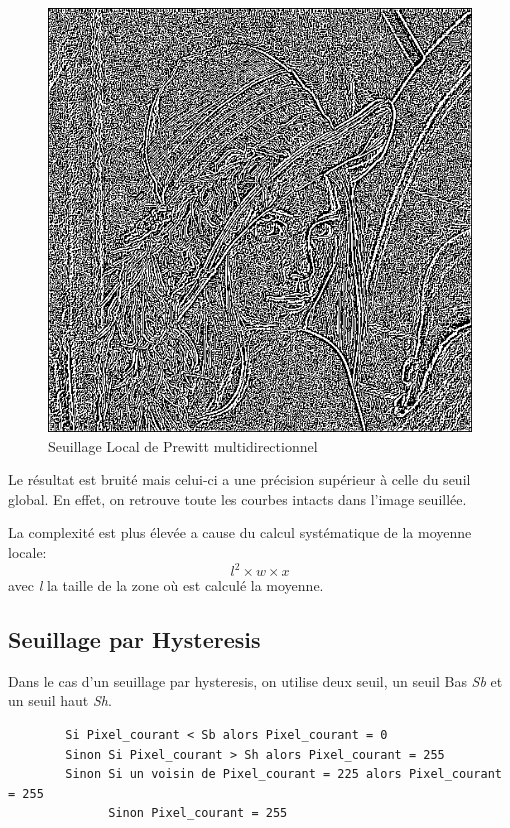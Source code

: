\documentclass[11pt]{article}
\begin{document}
	\begin{figure}[H]
		\centering
		\includegraphics[scale=0.25]{Image/seuilLocal.png}
		\caption{Seuillage Local de Prewitt multidirectionnel}
		\label{fig:seuilLocal}
	\end{figure} 

	Le résultat est  bruité mais celui-ci a une précision supérieur à celle du seuil global. 
	En effet, on retrouve toute les courbes intacts dans l'image seuillée.

	La complexité est plus élevée a cause du calcul systématique de la moyenne locale: \[l^2 \times w \times x\]
	avec \textit{l} la taille de la zone où est calculé la moyenne.

	\subsection{Seuillage par Hysteresis}

	Dans le cas d'un seuillage par hysteresis, on utilise deux seuil, un seuil Bas \textit{Sb} et un seuil haut \textit{Sh}.

	\begin{verbatim}
		Si Pixel_courant < Sb alors Pixel_courant = 0
		Sinon Si Pixel_courant > Sh alors Pixel_courant = 255
		Sinon Si un voisin de Pixel_courant = 225 alors Pixel_courant = 255
		      Sinon Pixel_courant = 255
	\end{verbatim}
\end{document}
